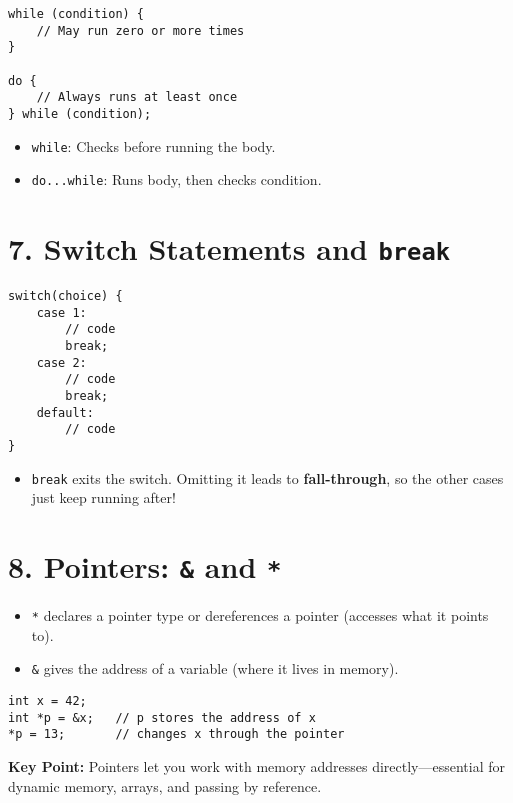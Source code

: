 \documentclass[12pt]{article}
\begin{document}
\begin{lstlisting}
while (condition) {
    // May run zero or more times
}

do {
    // Always runs at least once
} while (condition);
\end{lstlisting}
\begin{itemize}[noitemsep]
  \item \texttt{while}: Checks before running the body.
  \item \texttt{do...while}: Runs body, then checks condition.
\end{itemize}

\section*{7. Switch Statements and \texttt{break}}

\begin{lstlisting}
switch(choice) {
    case 1:
        // code
        break;
    case 2:
        // code
        break;
    default:
        // code
}
\end{lstlisting}
\begin{itemize}[noitemsep]
  \item \texttt{break} exits the switch. Omitting it leads to \textbf{fall-through}, so the other cases just keep running after!
\end{itemize}

\section*{8. Pointers: \texttt{\&} and \texttt{*}}

\begin{itemize}[noitemsep]
  \item \texttt{*} declares a pointer type or dereferences a pointer (accesses what it points to).
  \item \texttt{\&} gives the address of a variable (where it lives in memory).
\end{itemize}

\begin{lstlisting}
int x = 42;
int *p = &x;   // p stores the address of x
*p = 13;       // changes x through the pointer
\end{lstlisting}

\textbf{Key Point:}  
Pointers let you work with memory addresses directly—essential for dynamic memory, arrays, and passing by reference.
\end{document}
